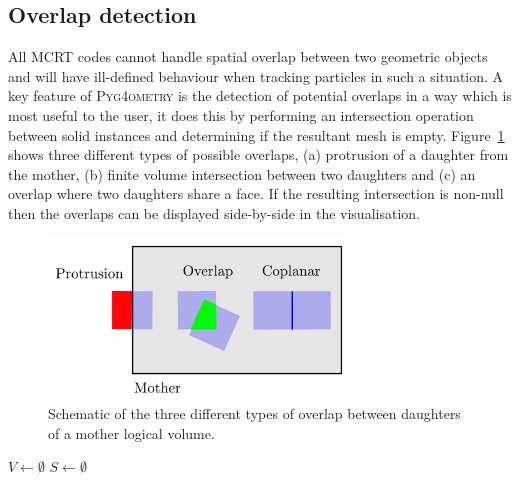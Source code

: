 \documentclass[final,5p,times,twocolumn]{elsarticle}
\newcommand{\PYGEOMETRY}{\textsc{Pyg4ometry}}
\begin{document}
\subsection{Overlap detection}
All MCRT codes cannot handle spatial overlap between two geometric objects and will have ill-defined behaviour when tracking particles  
in such a situation.  A key feature of \PYGEOMETRY{} is the detection of potential overlaps in a way which is most useful to the user, it does this by 
performing an intersection operation between solid instances and determining if the resultant mesh is empty. Figure~\ref{fig:overlap} shows three different types of possible
overlaps, (a) protrusion of a daughter from the mother, (b)  finite volume intersection between two daughters  and (c) an overlap where two daughters 
share a face. If the resulting intersection is non-null then the overlaps can be displayed side-by-side in the visualisation. 
\begin{figure}[htbp]
\begin{center}
\includegraphics[width=8cm]{./diagrams/overlap.pdf}
\caption{Schematic of the three different types of overlap between daughters of a mother logical volume.}
\label{fig:overlap}
\end{center}
\end{figure} 


\begin{algorithm}[h]
  
  $V \longleftarrow \emptyset$
  $S \longleftarrow \emptyset$\;
  
  \label{algo:overlap}
  \caption{The overlap checking algorithm employed in \PYGEOMETRY{}.}
\end{algorithm}
\end{document}
